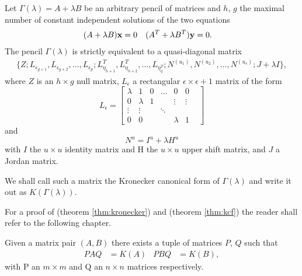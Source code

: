 \begin{theorem}\label{thm:kcf}
    Let \(\Gamma(\lambda) = A + \lambda B\) be an arbitrary pencil of matrices and \(h\), \(g\) the maximal number of constant
    independent solutions of the two equations
    \begin{align*}
        (A + \lambda B)\vb{x} &= 0 & (A^T + \lambda B^T)\vb{y} &= 0.
    \end{align*}
    The pencil \(\Gamma(\lambda)\) is strictly equivalent to a quasi-diagonal matrix
    \begin{gather*}
        \{
            Z;
            L_{\epsilon_{g+1}}, L_{\epsilon_{g+2}}, ..., L_{\epsilon_{p}};
            L_{\eta_{h+1}}^T, L_{\eta_{h+2}}^T, ..., L_{\eta_{q}^T};
            N^{(u_{1})}, N^{(u_{2})}, ..., N^{(u_{s})};
            J + \lambda I
        \},
    \end{gather*}
    where \(Z\) is an \(h \times g\) null matrix, \(L_{\epsilon}\) a rectangular \(\epsilon \times \epsilon + 1\) matrix of
    the form
    \[
        L_{\epsilon} =
        \begin{bmatrix}
            \lambda        &      1     &       0      &     \ldots       &    0       &    0   \\
            0              & \lambda    &       1      &                  & \vdots     & \vdots \\
            \vdots         & \vdots     &     & \ddots    &      &            &        \\
            0              &      0     &              &                  & \lambda    &    1   
        \end{bmatrix}
    \]
    and
    \[
        N^u = I^u + \lambda H^u
    \]
    with \(I\) the \(u \times u\) identity matrix and H the \(u \times u\) upper shift matrix, and \(J\) a Jordan matrix.

    We shall call such a matrix the Kronecker canonical form of \(\Gamma(\lambda)\) and write it
    out as \(K(\Gamma(\lambda))\).
\end{theorem}

For a proof of  (theorem \ref{thm:kronecker}) and  (theorem \ref{thm:kcf})
the reader shall refer to the following chapter.

\begin{corollary}
    Given a matrix pair \((A, B)\) there exists a tuple of matrices \(P\), \(Q\) such that
    \begin{align*}
        P A Q &= K(A) & P B Q &= K(B),
    \end{align*}
    with P an \(m \times m\) and Q an \(n \times n\) matrices respectively.
\end{corollary}

